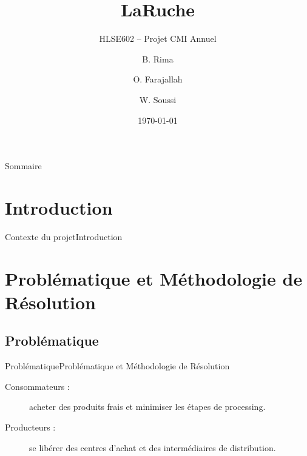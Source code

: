 \documentclass{beamer}
\title{LaRuche}
\subtitle{HLSE602 -- Projet CMI Annuel}
\author{B. Rima \and O. Farajallah \and W. Soussi}
\institute[UM]{L3 CMI Informatique}
\date{\today}
\begin{document}
\begin{frame}
\titlepage
\end{frame}
\begin{frame}{Sommaire}
\tableofcontents
\end{frame}
\section{Introduction}
\begin{frame}{Contexte du projet}{Introduction}
\end{frame}

\section{Problématique et Méthodologie de Résolution}
\subsection{Problématique}
\begin{frame}{Problématique}{Problématique et Méthodologie de Résolution}
  \begin{description}
    \item[Consommateurs :] acheter des produits frais et minimiser les étapes de processing.
    \item[Producteurs :] se libérer des centres d'achat et des intermédiaires de distribution.
  \end{description}
\end{frame}
\end{document}
